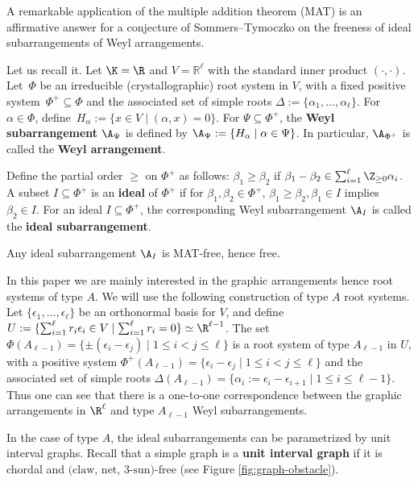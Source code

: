 A remarkable application of the multiple addition theorem (MAT) is an affirmative answer for a conjecture of Sommers--Tymoczko \cite{ST06} on the freeness of ideal subarrangements of Weyl arrangements. 

Let us recall it. 
Let $\K=\R$ and $V = \mathbb{R}^\ell$ with the standard inner product $(\cdot,\cdot)$.
 Let~$\Phi$ be an irreducible (crystallographic) root system in $V$, with a fixed positive system~$\Phi^+ \subseteq \Phi$ and the associated set of simple roots $\Delta := \{\alpha_1,\ldots,\alpha_\ell \}$. 
 For  $\alpha \in  \Phi$, define~$H_{\alpha} :=\{x\in V \mid(\alpha,x)=0\}.$ 
 For $\Psi\subseteq\Phi^+$, the \textbf{Weyl subarrangement} $\A_{\Psi}$ is  defined by $\A_{\Psi}:= \{H_{\alpha} \mid \alpha\in\Psi\}$. 
In particular, $\A_{\Phi^+}$ is called the \textbf{Weyl arrangement}. 

Define the partial order $\ge$ on $\Phi^+$ as follows: $\beta_1 \ge \beta_2$ if $\beta_1-\beta_2 \in\sum_{i=1}^\ell \Z_{\ge 0}\alpha_i$. 
A subset $I\subseteq\Phi^+$ is an \textbf{ideal} of $\Phi^+$  if for $\beta_1,\beta_2 \in \Phi^+$, $\beta_1 \ge \beta_2, \beta_ 1 \in I$ implies $\beta_2 \in I$. 
For an ideal $I\subseteq\Phi^+$, the corresponding Weyl subarrangement $\A_{I}$ is called the \textbf{ideal subarrangement}.

\begin{theorem}
\label{thm:ideal-free}
Any ideal subarrangement $\A_{I}$ is MAT-free, hence free.
\end{theorem}

In this paper we are mainly interested in the graphic arrangements hence root systems of type $A$. 
We will use the following construction of type $A$ root systems.
Let $\{\epsilon_1, \ldots, \epsilon_{\ell}\}$ be an orthonormal basis for $V$, and define $U : = \{ \sum_{i=1}^{\ell} r_i\epsilon_i  \in V\mid \sum_{i=1}^{\ell} r_i=0\} \simeq \R^{\ell-1}$. 
 The set $\Phi(A_{\ell-1}) = \{\pm(\epsilon_i - \epsilon_j) \mid 1 \le i<j \le \ell\}$ 
is a root system of type $A_{\ell-1}$ in $U$, with a positive system
$
\Phi^+(A_{\ell-1}) =  \{ \epsilon_i-\epsilon_j \mid 1 \le i <  j \le \ell\}
$
 and the associated set of simple roots $\Delta(A_{\ell-1}) = \{\alpha_i:=\epsilon_i - \epsilon_{i+1} \mid 1 \le i  \le \ell-1\}$.
Thus one can see that there is a one-to-one correspondence between the graphic arrangements in $\R^\ell$ and type $A_{\ell-1}$ Weyl subarrangements.

In the case of type $A$, the ideal subarrangements can be parametrized by unit interval graphs. 
Recall that a simple graph is a \textbf{unit interval graph} if it is chordal and $\mbox{(claw, net, $3$-sun)-free}$ (see Figure \ref{fig:graph-obstacle}).

